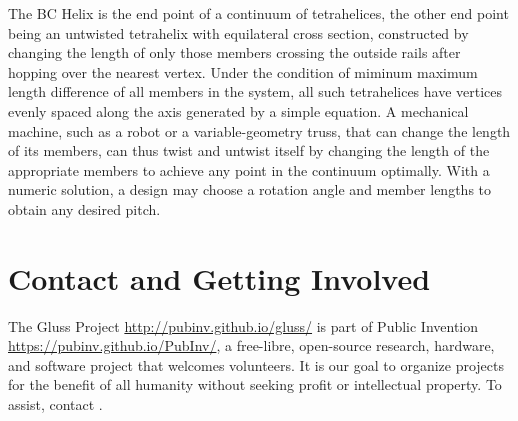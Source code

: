 \documentclass[review]{siamonline1116}
\begin{document}
The BC Helix is the end point of a continuum of tetrahelices, the
other end point being an untwisted tetrahelix with equilateral cross
section, constructed by changing the length of only those members
crossing the outside rails after hopping over the nearest
vertex. Under the condition of miminum maximum length difference of
all members in the system, all such tetrahelices have vertices evenly
spaced along the axis generated by a simple equation.  A mechanical
machine, such as a robot or a variable-geometry truss, that can change
the length of its members, can thus twist and untwist itself by
changing the length of the appropriate members to achieve any point in
the continuum optimally. With a numeric solution, a design may choose
a rotation angle and member lengths to obtain any desired pitch.

\section{Contact and Getting Involved}

The Gluss Project \url{http://pubinv.github.io/gluss/} is part of Public Invention \url{https://pubinv.github.io/PubInv/},
a free-libre, open-source research, hardware, and software project that welcomes volunteers.
It is our goal to organize projects for the benefit of all humanity without seeking profit or intellectual property.
To assist, contact .



\end{document}
